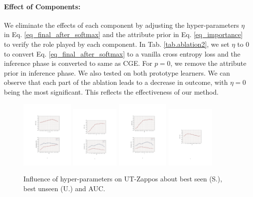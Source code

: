 \documentclass[letterpaper]{article} %
\theoremstyle{definition}
\begin{document}
\paragraph{Effect of Components:} 
We eliminate the effects of each component by adjusting the hyper-parameters $\eta$ in Eq. \ref{eq_final_after_softmax} and the attribute prior in Eq. \ref{eq_importance} to verify the role played by each component. In Tab. \ref{tab.ablation2}, we set $\eta$ to 0 to convert Eq. \ref{eq_final_after_softmax} to a vanilla cross entropy loss and the inference phase is converted to same as CGE. For $p=0$, we remove the attribute prior in inference phase. We also tested on both prototype learners. We can observe that each part of the ablation leads to a decrease in outcome, with $\eta=0$ being the most significant. This reflects the effectiveness of our method.


  \begin{figure}[t]
	\centering
		\subfigure
		{
			\includegraphics[width=0.23\textwidth]{ FIG_HYPER_1.pdf}
		}
  		\subfigure
		{
			\includegraphics[width=0.21\textwidth]{ FIG_HYPER_2bpdf.pdf}
		}
  		\subfigure
		{
			\includegraphics[width=0.23\textwidth]{ FIG_HYPER_3.pdf}
		}
  		\subfigure
		{
			\includegraphics[width=0.21\textwidth]{ FIG_HYPER_4b.pdf}
		}
	\caption{Influence of hyper-parameters on UT-Zappos about best seen (S.), best unseen (U.) and AUC.}
	\label{fig_hyper}
\end{figure}
\end{document}
